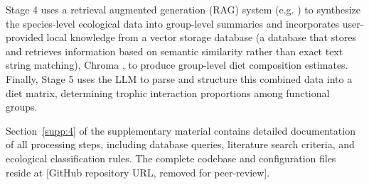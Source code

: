 Stage 4 uses a retrieval augmented generation (RAG) system (e.g. \citep{keck2025extracting}) to synthesize the species-level ecological data into group-level summaries and incorporates user-provided local knowledge from a vector storage database (a database that stores and retrieves information based on semantic similarity rather than exact text string matching), Chroma \citep{Chroma2024}, to produce group-level diet composition estimates. Finally, Stage 5 uses the LLM to parse and structure this combined data into a diet matrix, determining trophic interaction proportions among functional groups.

Section~\ref{supp:4} of the supplementary material contains detailed documentation of all processing steps, including database queries, literature search criteria, and ecological classification rules. The complete codebase and configuration files reside at [GitHub repository URL, removed for peer-review].
